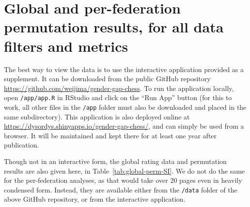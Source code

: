 \documentclass[9pt,twoside,lineno]{pnas-new}
\begin{document}
\section*{Global and per-federation permutation results, for all data filters and metrics}

The best way to view the data is to use the interactive application provided as a supplement. It can be downloaded from the public GitHub repository \url{https://github.com/weijima/gender-gap-chess}. To run the application locally, open \texttt{/app/app.R} in RStudio and click on the ``Run App'' button (for this to work, all other files in the \texttt{/app} folder must also be downloaded and placed in the same subdirectory). This application is also deployed online at \url{https://dysordys.shinyapps.io/gender-gap-chess/}, and can simply be used from a browser. It will be maintained and kept there for at least one year after publication.

Though not in an interactive form, the global rating data and permutation results are also given here, in Table~\ref{tab:global-perm-SI}. We do not do the same for the per-federation analyses, as that would take over 20 pages even in heavily condensed form. Instead, they are available either from the \texttt{/data} folder of the above GitHub repository, or from the interactive application.
\end{document}
